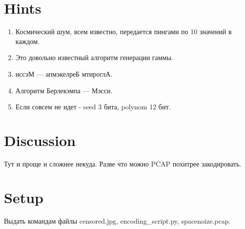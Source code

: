 \documentclass{article}
\begin{document}
	\section{Hints}
	
	\begin{enumerate}
		\item Космический шум, всем известно, передается пингами по 10 значений в каждом.
		\item Это довольно известный алгоритм генерации гаммы.
		\item иссэМ — апмэкелреБ мтироглА.
		\item Алгоритм Берлекэмпа — Мэсси.
		\item Если совсем не идет - seed 3 бита, polynom 12 бит.
	\end{enumerate}
	
	\section{Discussion}
	
	Тут и проще и сложнее некуда. Разве что можно PCAP похитрее закодировать.
	
	\section{Setup}
	
	Выдать командам файлы censored.jpg, encoding\_script.py, spacenoize.pcap.
	
\end{document}
